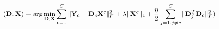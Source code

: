 \documentclass{standalone}
\begin{document}
$ \displaystyle
    (\mathbf{D}, \mathbf{X}) = \arg\min_{\mathbf{D}, \mathbf{X}} \sum_{c=1}^C \|\mathbf{Y}_c - \mathbf{D}_c\mathbf{X}^c\|_F^2 + \lambda\|\mathbf{X}^c\|_1 + \frac{\eta}{2} \sum_{j = 1, j \neq c}^C \|\mathbf{D}_j^T\mathbf{D}_c\|_F^2)
$
\end{document}
